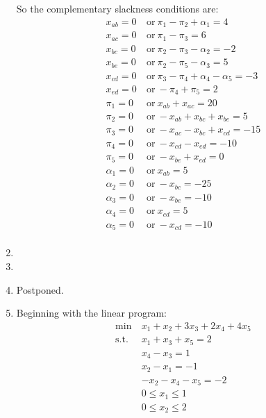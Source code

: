 \documentclass[12pt]{article}
\begin{document}
\begin{enumerate}
  So the complementary slackness conditions are:\\
  \begin{equation}
    \begin{split}
      x_{ab}=0\ &\text{or}\ \pi_1-\pi_2+\alpha_1=4\\
      x_{ac}=0\ &\text{or}\ \pi_1-\pi_3=6\\
      x_{bc}=0\ &\text{or}\ \pi_2-\pi_3-\alpha_2=-2\\
      x_{be}=0\ &\text{or}\ \pi_2-\pi_5-\alpha_3=5\\
      x_{cd}=0\ &\text{or}\ \pi_3-\pi_4+\alpha_4-\alpha_5=-3\\
      x_{ed}=0\ &\text{or}\ -\pi_4+\pi_5=2\\
      \pi_1=0\ &\text{or}\ x_{ab}+x_{ac}=20\\
      \pi_2=0\ &\text{or}\ -x_{ab}+x_{bc}+x_{be}=5\\
      \pi_3=0\ &\text{or}\ -x_{ac}-x_{bc}+x_{cd}=-15\\
      \pi_4=0\ &\text{or}\ -x_{cd}-x_{ed}=-10\\
      \pi_5=0\ &\text{or}\ -x_{be}+x_{ed}=0\\
      \alpha_1=0\ &\text{or}\ x_{ab}=5\\
      \alpha_2=0\ &\text{or}\ -x_{bc}=-25\\
      \alpha_3=0\ &\text{or}\ -x_{be}=-10\\
      \alpha_4=0\ &\text{or}\ x_{cd}=5\\
      \alpha_5=0\ &\text{or}\ -x_{cd}=-10\\
    \end{split}
  \end{equation}
  \item
  \item
  \item Postponed.
  \item
    Beginning with the linear program:\\
    \begin{equation}
      \begin{split}
        \text{min}\ &x_1+x_2+3x_3+2x_4+4x_5\\
        \text{s.t.}\ &x_1+x_3+x_5=2\\
        &x_4-x_3=1\\
        &x_2-x_1=-1\\
        &-x_2-x_4-x_5=-2\\
        &0\leq x_1\leq1\\
        &0\leq x_2\leq2\\

\end{split}
\end{equation}
\end{enumerate}
\end{document}
